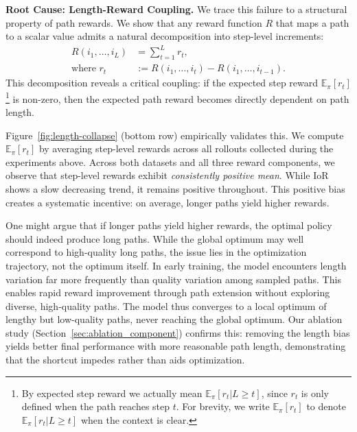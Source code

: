 \documentclass{llmxive}
\begin{document}
 
\textbf{Root Cause: Length-Reward Coupling.} We trace this failure to a structural property of path rewards. We show that any reward function $R$ that maps a path to a scalar value admits a natural decomposition into step-level increments:
\begin{equation}
\begin{split}
R(i_1, \ldots, i_L) &= \sum_{t=1}^{L} r_t, \\
\text{where } r_t &:= R(i_1, \ldots, i_t) - R(i_1, \ldots, i_{t-1}).
\end{split}
\label{eq:reward_decomposition}
\end{equation}
This decomposition reveals a critical coupling: if the expected step reward $\mathbb{E}_\pi[r_t]$
\footnote{By expected step reward we actually mean $\mathbb{E}_\pi[r_t | L \ge t]$, since $r_t$ is only defined when the path reaches step $t$. For brevity, we write $\mathbb{E}_\pi[r_t]$ to denote $\mathbb{E}_\pi[r_t | L \ge t]$ when the context is clear.}
is non-zero, then the expected path reward becomes directly dependent on path length.
 
Figure~\ref{fig:length-collapse} (bottom row) empirically validates this. We compute $\mathbb{E}_{\pi}[r_t]$ by averaging step-level rewards across all rollouts collected during the experiments above. Across both datasets and all three reward components, we observe that step-level rewards exhibit \emph{consistently positive mean}. While IoR shows a slow decreasing trend, it remains positive throughout. This positive bias creates a systematic incentive: on average, longer paths yield higher rewards.

One might argue that if longer paths yield higher rewards, the optimal policy should indeed produce long paths. While the global optimum may well correspond to high-quality long paths, the issue lies in the optimization trajectory, not the optimum itself. In early training, the model encounters length variation far more frequently than quality variation among sampled paths. This enables rapid reward improvement through path extension without exploring diverse, high-quality paths. The model thus converges to a local optimum of lengthy but low-quality paths, never reaching the global optimum. Our ablation study (Section~\ref{sec:ablation_component}) confirms this: removing the length bias yields better final performance with more reasonable path length, demonstrating that the shortcut impedes rather than aids optimization.
 
\end{document}

